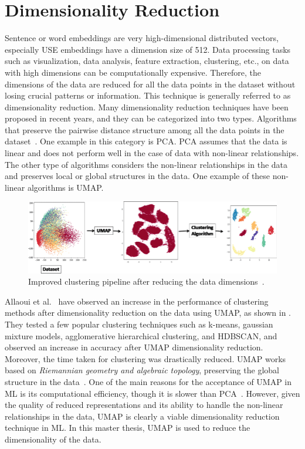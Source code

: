 \section{Dimensionality Reduction}

Sentence or word embeddings are very high-dimensional distributed vectors, especially \ac{USE} embeddings have a dimension size of 512. Data processing tasks such as visualization, data analysis, feature extraction, clustering, etc., on data with high dimensions can be computationally expensive. Therefore, the dimensions of the data are reduced for all the data points in the dataset without losing crucial patterns or information. This technique is generally referred to as dimensionality reduction. Many dimensionality reduction techniques have been proposed in recent years, and they can be categorized into two types. Algorithms that preserve the pairwise distance structure among all the data points in the dataset~\cite{mcinnes2018umap}. One example in this category is \ac{PCA}. \ac{PCA} assumes that the data is linear and does not perform well in the case of data with non-linear relationships. The other type of algorithms considers the non-linear relationships in the data and preserves local or global structures in the data. One example of these non-linear algorithms is \ac{UMAP}.


\begin{figure}[h]
	\centering
	\includegraphics[width=.9\textwidth]{images/papers/umap.png}
	\caption[UMAP pipeline for clustering.]{Improved clustering pipeline after reducing the data dimensions~\cite{allaoui2020considerably}.  \label{fig:umap}}
\end{figure}

Allaoui et al.~\cite{allaoui2020considerably} have observed an increase in the performance of clustering methods after dimensionality reduction on the data using \ac{UMAP}, as shown in . They tested a few popular clustering techniques such as k-means, gaussian mixture models, agglomerative hierarchical clustering, and \ac{HDBSCAN}, and observed an increase in accuracy after \ac{UMAP} dimensionality reduction. Moreover, the time taken for clustering was drastically reduced. \ac{UMAP} works based on \emph{Riemannian geometry and algebraic topology}, preserving the global structure in the data~\cite{mcinnes2018umap}. One of the main reasons for the acceptance of \ac{UMAP} in \ac{ML} is its computational efficiency, though it is slower than \ac{PCA}~\cite{umaplearnPerformanceComparison}. However, given the quality of reduced representations and its ability to handle the non-linear relationships in the data, \ac{UMAP} is clearly a viable dimensionality reduction technique in \ac{ML}. In this master thesis, \ac{UMAP} is used to reduce the dimensionality of the data.




